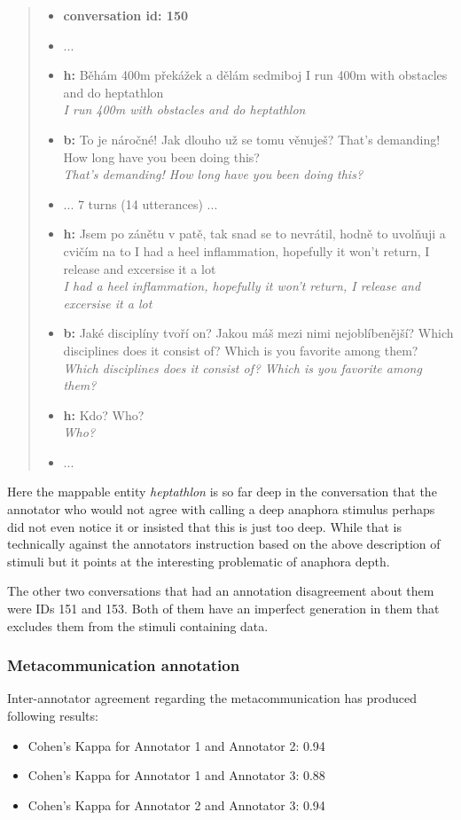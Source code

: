 \documentclass[12pt]{report}
\newcommand{\utterance}[3]{%
    \textbf{#1} #2%
    \ifx\relax#3\relax%
    \else \\ \textit{#3}%
    \fi%
}
\begin{document}
{\begin{quote}
\begin{itemize}[label={}, leftmargin=0pt, itemsep=0.5em]
\item \textbf{conversation id: 150}
\item ...
\item \utterance{h:}{Běhám 400m překážek a dělám sedmiboj}{I run 400m with obstacles and do heptathlon}
\item \utterance{b:}{To je náročné! Jak dlouho už se tomu věnuješ?}{That's demanding! How long have you been doing this?}
\item ... 7 turns (14 utterances) ...
\item \utterance{h:}{Jsem po zánětu v patě, tak snad se to nevrátil, hodně to uvolňuji a cvičím na to}{I had a heel inflammation, hopefully it won't return, I release and excersise it a lot}
\item \utterance{b:}{Jaké disciplíny tvoří on? Jakou máš mezi nimi nejoblíbenější?}{Which disciplines does it consist of? Which is you favorite among them?}
\item \utterance{h:}{Kdo?}{Who?}
\item ...
\end{itemize}
\end{quote}

Here the mappable entity \textit{heptathlon} is so far deep in the conversation that
the annotator who would not agree with calling a deep anaphora stimulus
perhaps did not even notice it or insisted that this is just too deep.
While that is technically against the annotators instruction based on the above description of stimuli
but it points at the interesting problematic of anaphora depth.

The other two conversations that had an annotation disagreement about them were IDs 151 and 153.
Both of them have an imperfect generation in them that excludes them from the stimuli containing data.

\subsubsection{Metacommunication annotation}

Inter-annotator agreement regarding the metacommunication has produced following results:

\begin{itemize}[label={}]
\item Cohen's Kappa for Annotator 1 and Annotator 2: 0.94
\item Cohen's Kappa for Annotator 1 and Annotator 3: 0.88
\item Cohen's Kappa for Annotator 2 and Annotator 3: 0.94
\end{itemize}

}
\end{document}
